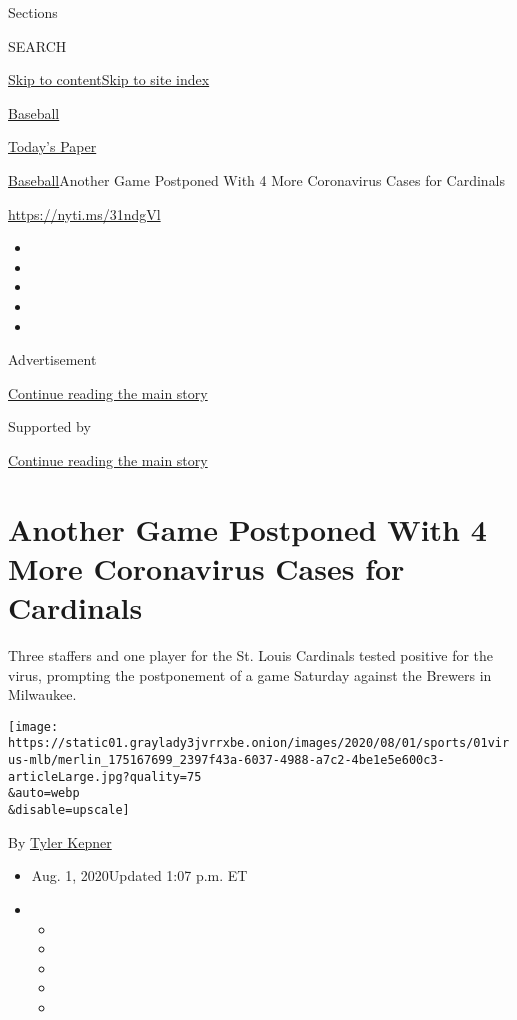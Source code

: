 Sections

SEARCH

\protect\hyperlink{site-content}{Skip to
content}\protect\hyperlink{site-index}{Skip to site index}

\href{https://www.nytimes3xbfgragh.onion/section/sports/baseball}{Baseball}

\href{https://myaccount.nytimes3xbfgragh.onion/auth/login?response_type=cookie\&client_id=vi}{}

\href{https://www.nytimes3xbfgragh.onion/section/todayspaper}{Today's
Paper}

\href{/section/sports/baseball}{Baseball}\textbar{}Another Game
Postponed With 4 More Coronavirus Cases for Cardinals

\url{https://nyti.ms/31ndgVl}

\begin{itemize}
\item
\item
\item
\item
\item
\end{itemize}

Advertisement

\protect\hyperlink{after-top}{Continue reading the main story}

Supported by

\protect\hyperlink{after-sponsor}{Continue reading the main story}

\hypertarget{another-game-postponed-with-4-more-coronavirus-cases-for-cardinals}{%
\section{Another Game Postponed With 4 More Coronavirus Cases for
Cardinals}\label{another-game-postponed-with-4-more-coronavirus-cases-for-cardinals}}

Three staffers and one player for the St. Louis Cardinals tested
positive for the virus, prompting the postponement of a game Saturday
against the Brewers in Milwaukee.

\texttt{[image: https://static01.graylady3jvrrxbe.onion/images/2020/08/01/sports/01virus-mlb/merlin\_175167699\_2397f43a-6037-4988-a7c2-4be1e5e600c3-articleLarge.jpg?quality=75\\\&auto=webp\\\&disable=upscale]}

By \href{https://www.nytimes3xbfgragh.onion/by/tyler-kepner}{Tyler
Kepner}

\begin{itemize}
\item
  Aug. 1, 2020Updated 1:07 p.m. ET
\item
  \begin{itemize}
  \item
  \item
  \item
  \item
  \item
  \end{itemize}
\end{itemize}

